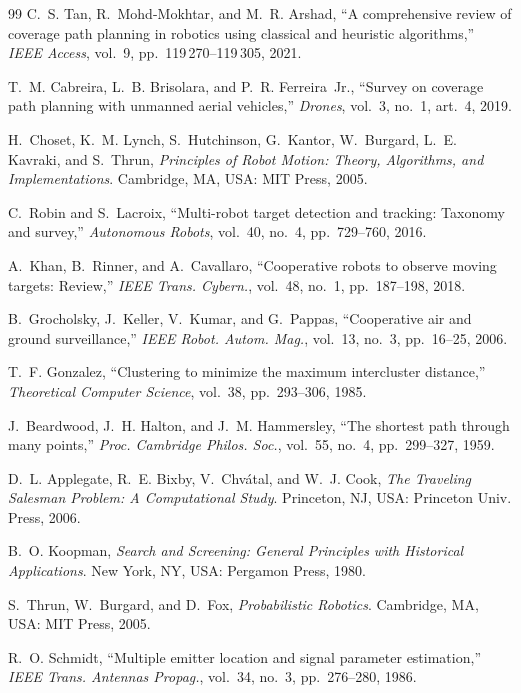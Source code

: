 \documentclass[journal,10pt]{IEEEtran}
\theoremstyle{definition}
\begin{document}
\begin{thebibliography}{99}
C.~S. Tan, R.~Mohd-Mokhtar, and M.~R. Arshad, ``A comprehensive review of coverage path planning
in robotics using classical and heuristic algorithms,'' \emph{IEEE Access}, vol.~9,
pp.~119\,270--119\,305, 2021.

T.~M. Cabreira, L.~B. Brisolara, and P.~R. Ferreira~Jr., ``Survey on coverage path planning with
unmanned aerial vehicles,'' \emph{Drones}, vol.~3, no.~1, art.~4, 2019.

H.~Choset, K.~M. Lynch, S.~Hutchinson, G.~Kantor, W.~Burgard, L.~E. Kavraki, and S.~Thrun,
\emph{Principles of Robot Motion: Theory, Algorithms, and Implementations}. Cambridge, MA, USA:
MIT Press, 2005.

C.~Robin and S.~Lacroix, ``Multi-robot target detection and tracking: Taxonomy and survey,''
\emph{Autonomous Robots}, vol.~40, no.~4, pp.~729--760, 2016.

A.~Khan, B.~Rinner, and A.~Cavallaro, ``Cooperative robots to observe moving targets: Review,''
\emph{IEEE Trans. Cybern.}, vol.~48, no.~1, pp.~187--198, 2018.

B.~Grocholsky, J.~Keller, V.~Kumar, and G.~Pappas, ``Cooperative air and ground surveillance,''
\emph{IEEE Robot. Autom. Mag.}, vol.~13, no.~3, pp.~16--25, 2006.

T.~F. Gonzalez, ``Clustering to minimize the maximum intercluster distance,''
\emph{Theoretical Computer Science}, vol.~38, pp.~293--306, 1985.

J.~Beardwood, J.~H. Halton, and J.~M. Hammersley, ``The shortest path through many points,''
\emph{Proc. Cambridge Philos. Soc.}, vol.~55, no.~4, pp.~299--327, 1959.

D.~L. Applegate, R.~E. Bixby, V.~Chv\'atal, and W.~J. Cook, \emph{The Traveling Salesman
Problem: A Computational Study}. Princeton, NJ, USA: Princeton Univ. Press, 2006.

B.~O. Koopman, \emph{Search and Screening: General Principles with Historical Applications}.
New York, NY, USA: Pergamon Press, 1980.

S.~Thrun, W.~Burgard, and D.~Fox, \emph{Probabilistic Robotics}. Cambridge, MA, USA: MIT Press,
2005.

R.~O. Schmidt, ``Multiple emitter location and signal parameter estimation,''
\emph{IEEE Trans. Antennas Propag.}, vol.~34, no.~3, pp.~276--280, 1986.


\end{thebibliography}
\end{document}
